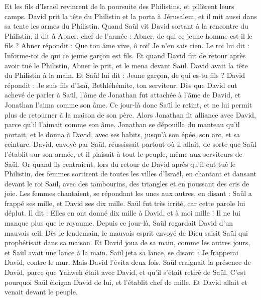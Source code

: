 \begin{multicols}{2}
Et les fils d'Israël revinrent de la poursuite des Philistins, et pillèrent leurs camps.
David prit la tête du Philistin et la porta à Jérusalem, et il mit aussi dans sa tente les armes du Philistin.
Quand Saül vit David sortant à la rencontre du Philistin, il dit à Abner, chef de l'armée : Abner, de qui ce jeune homme est-il le fils ? Abner répondit : Que ton âme vive, ô roi! Je n'en sais rien.
Le roi lui dit : Informe-toi de qui ce jeune garçon est fils.
Et quand David fut de retour après avoir tué le Philistin, Abner le prit, et le mena devant Saül. David avait la tête du Philistin à la main.
Et Saül lui dit : Jeune garçon, de qui es-tu fils ? David répondit : Je suis fils d'Isaï, Bethléhémite, ton serviteur.
\VerseOne{}Dès que David eut achevé de parler à Saül, l'âme de Jonathan fut attachée à l'âme de David, et Jonathan l'aima comme son âme.
Ce jour-là donc Saül le retint, et ne lui permit plus de retourner à la maison de son père.
Alors Jonathan fit alliance avec David, parce qu'il l'aimait comme son âme.
Jonathan se dépouilla du manteau qu'il portait, et le donna à David, avec ses habits, jusqu'à son épée, son arc, et sa ceinture.
David, envoyé par Saül, réussissait partout où il allait, de sorte que Saül l'établit sur son armée, et il plaisait à tout le peuple, même aux serviteurs de Saül.
Or quand ils rentraient, lors du retour de David après qu'il eut tué le Philistin, des femmes sortirent de toutes les villes d'Israël, en chantant et dansant devant le roi Saül, avec des tambourins, des triangles et en poussant des cris de joie.
Les femmes chantaient, se répondant les unes aux autres, en disant : Saül a frappé ses mille, et David ses dix mille.
Saül fut très irrité, car cette parole lui déplut. Il dit : Elles en ont donné dix mille à David, et à moi mille ! Il ne lui manque plus que le royaume.
Depuis ce jour-là, Saül regardait David d'un mauvais œil.
Dès le lendemain, le mauvais esprit envoyé de Dieu saisit Saül qui prophétisait dans sa maison. Et David joua de sa main, comme les autres jours, et Saül avait une lance à la main.
Saül jeta sa lance, se disant : Je frapperai David, contre le mur. Mais David l'évita deux fois.
Saül craignait la présence de David, parce que Yahweh était avec David, et qu'il s'était retiré de Saül.
C'est pourquoi Saül éloigna David de lui, et l'établit chef de mille. Et David allait et venait devant le peuple.

\end{multicols}

